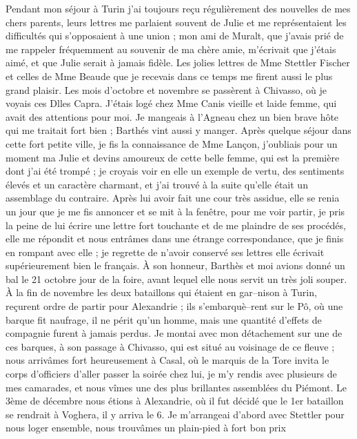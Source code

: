\documentclass[12pt]{article}
\begin{document}
 Pendant mon séjour à Turin j’ai toujours reçu
régulièrement des nouvelles de mes chers parents, leurs lettres me parlaient souvent de Julie et me
représentaient les difficultés qui s’opposaient à une union ; mon ami de Muralt, que j’avais prié de
me rappeler fréquemment au souvenir de ma chère amie, m’écrivait que j’étais aimé, et que Julie
serait à jamais fidèle. Les jolies lettres de Mme Stettler Fischer et celles de Mme Beaude que je
recevais dans ce temps me firent aussi le plus grand plaisir. Les mois d’octobre et novembre se
passèrent à Chivasso, où je voyais ces Dlles Capra. J’étais logé chez Mme Canis vieille et laide
femme, qui avait des attentions pour moi. Je mangeais à l’Agneau chez un bien brave hôte qui me
traitait fort bien ; Barthés vint aussi y manger. Après quelque séjour dans cette fort petite ville,
je fis la connaissance de Mme Lançon, j’oubliais pour un moment ma Julie et devins amoureux de cette
belle femme, qui est la première dont j’ai été trompé ; je croyais voir en elle un exemple de vertu,
des sentiments élevés et un caractère charmant, et j’ai trouvé à la suite qu’elle était un
assemblage du contraire. Après lui avoir fait une cour très assidue, elle se renia un jour que je me
fis annoncer et se mit à la fenêtre, pour me voir partir, je pris la peine de lui écrire une lettre
fort touchante et de me plaindre de ses procédés, elle me répondit et nous entrâmes dans une étrange
correspondance, que je finis en rompant avec elle ; je regrette de n’avoir conservé ses lettres elle
écrivait supérieurement bien le français. À son honneur, Barthès et moi avions donné un bal le 21
octobre jour de la foire, avant lequel elle nous servit un très joli souper. À la fin de novembre
les deux bataillons qui étaient en gar–nison à Turin, reçurent ordre de partir pour Alexandrie ; ils
s’embarquè–rent sur le Pô, où une barque fit naufrage, il ne périt qu’un homme, mais une quantité
d’effets de compagnie furent à jamais perdus. Je montai avec mon détachement sur une de ces barques,
à son passage à Chivasso, qui est situé au voisinage de ce fleuve ; nous arrivâmes fort heureusement
à Casal, où le marquis de la Tore invita le corps d’officiers d’aller passer la soirée chez lui, je
m’y rendis avec plusieurs de mes camarades, et nous vîmes une des plus brillantes assemblées du
Piémont. Le 3ème de décembre nous étions à Alexandrie, où il fut décidé que le 1er bataillon se
rendrait à Voghera, il y arriva le 6. Je m’arrangeai d’abord avec Stettler pour nous loger ensemble,
nous trouvâmes un plain-pied à fort bon prix
\end{document}
